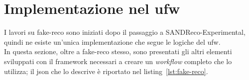 \documentclass[../../main.tex]{subfiles}
\begin{document}
\section{Implementazione nel ufw} \label{sec:Implementazione-nel-ufw}
  I lavori su fake-reco sono iniziati dopo il passaggio a
  SANDReco-Experimental, quindi ne esiste un'unica implementazione
  che segue le logiche del ufw.\\
  In questa sezione, oltre a fake-reco stesso, sono presentati gli
  altri elementi sviluppati con il framework necessari a creare un
  \textit{workflow} completo che lo utilizza; il json che lo descrive è
  riportato nel listing~\ref{lst:fake-reco}.

  

  

  

  
\end{document}
